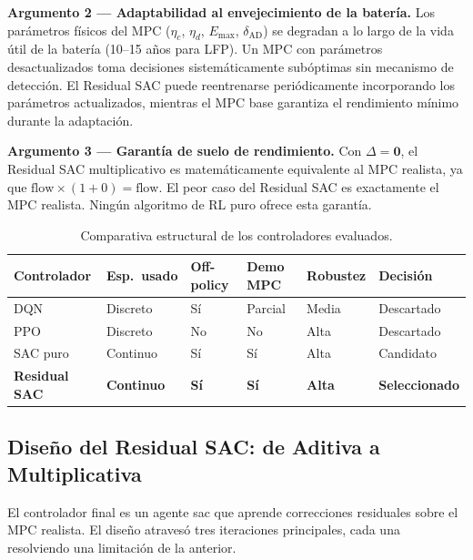 \documentclass[12pt, a4paper, twoside]{report}
\begin{document}
\textbf{Argumento 2 — Adaptabilidad al envejecimiento de la batería.} Los
parámetros físicos del MPC ($\eta_c$, $\eta_d$, $E_{\max}$, $\delta_{\text{AD}}$)
se degradan a lo largo de la vida útil de la batería (10--15 años para LFP). Un
MPC con parámetros desactualizados toma decisiones sistemáticamente subóptimas
sin mecanismo de detección. El Residual SAC puede reentrenarse periódicamente
incorporando los parámetros actualizados, mientras el MPC base garantiza el
rendimiento mínimo durante la adaptación.

\textbf{Argumento 3 — Garantía de suelo de rendimiento.} Con $\Delta = \mathbf{0}$,
el Residual SAC multiplicativo es matemáticamente equivalente al MPC realista,
ya que $\text{flow} \times (1 + 0) = \text{flow}$. El peor caso del Residual SAC
es exactamente el MPC realista. Ningún algoritmo de RL puro ofrece esta
garantía.

\begin{table}[H]
\centering
\caption{Comparativa estructural de los controladores evaluados.}
\label{tab:candidatos}
\begin{tabularx}{\textwidth}{L{2.5cm}C{1.6cm}C{1.7cm}C{1.8cm}C{1.7cm}L{2cm}}
\toprule
\textbf{Controlador} & \textbf{Esp.\ usado} & \textbf{Off-policy} &
\textbf{Demo MPC} & \textbf{Robustez} & \textbf{Decisión} \\
\midrule
DQN & Discreto & Sí & Parcial & Media & Descartado \\
PPO & Discreto & No & No & Alta & Descartado \\
SAC puro & Continuo & Sí & Sí & Alta & Candidato \\
\textbf{Residual SAC} & \textbf{Continuo} & \textbf{Sí} & \textbf{Sí} &
\textbf{Alta} & \textbf{Seleccionado} \\
\bottomrule
\end{tabularx}
\end{table}

\subsection{Diseño del Residual SAC: de Aditiva a Multiplicativa}
\label{sub:residual_sac}

El controlador final es un agente \acrshort{sac} que aprende correcciones
residuales sobre el MPC realista. El diseño atravesó tres iteraciones
principales, cada una resolviendo una limitación de la anterior.
\end{document}
